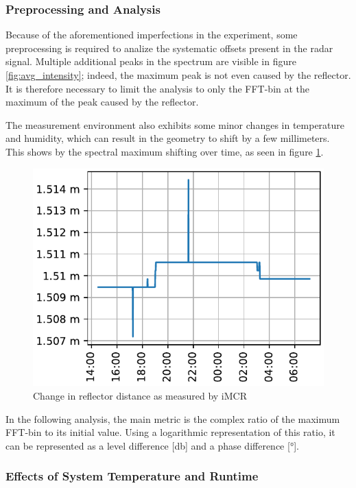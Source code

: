 \subsubsection*{Preprocessing and Analysis}
Because of the aforementioned imperfections in the experiment, some preprocessing is required to analize the systematic offsets present in the radar signal.
Multiple additional peaks in the spectrum are visible in figure \ref{fig:avg_intensity}; indeed, the maximum peak is not even caused by the reflector.
It is therefore necessary to limit the analysis to only the FFT-bin at the maximum of the peak caused by the reflector.

The measurement environment also exhibits some minor changes in temperature and humidity, which can result in the geometry to shift by a few millimeters.
This shows by the spectral maximum shifting over time, as seen in figure \ref{fig:refldist}.

\begin{figure}
    \centering
    \includegraphics[height=0.25\textheight]{../figures/refldist.pdf}
    \caption{Change in reflector distance as measured by iMCR}
    \label{fig:refldist}
\end{figure}

In the following analysis, the main metric is the complex ratio of the maximum FFT-bin to its initial value.
Using a logarithmic representation  of this ratio, it can be represented as a level difference [\unit{\decibel}] and a phase difference [\unit{\degree}].

\subsubsection*{Effects of System Temperature and Runtime}

